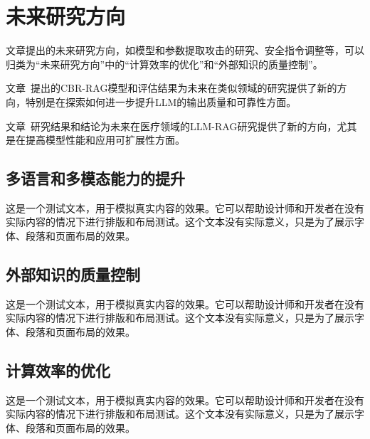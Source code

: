 
\chapter{未来研究方向}

文章提出的未来研究方向，如模型和参数提取攻击的研究、安全指令调整等，可以归类为“未来研究方向”中的“计算效率的优化”和“外部知识的质量控制”。~\cite{Yao2024}


文章~\cite{Wiratunga2024}提出的CBR-RAG模型和评估结果为未来在类似领域的研究提供了新的方向，特别是在探索如何进一步提升LLM的输出质量和可靠性方面。


文章~\cite{ke2024developmenttestingretrievalaugmented}研究结果和结论为未来在医疗领域的LLM-RAG研究提供了新的方向，尤其是在提高模型性能和应用可扩展性方面。

\section{多语言和多模态能力的提升}

这是一个测试文本，用于模拟真实内容的效果。它可以帮助设计师和开发者在没有实际内容的情况下进行排版和布局测试。这个文本没有实际意义，只是为了展示字体、段落和页面布局的效果。

\section{外部知识的质量控制}

这是一个测试文本，用于模拟真实内容的效果。它可以帮助设计师和开发者在没有实际内容的情况下进行排版和布局测试。这个文本没有实际意义，只是为了展示字体、段落和页面布局的效果。

\section{计算效率的优化}

这是一个测试文本，用于模拟真实内容的效果。它可以帮助设计师和开发者在没有实际内容的情况下进行排版和布局测试。这个文本没有实际意义，只是为了展示字体、段落和页面布局的效果。